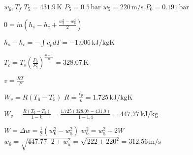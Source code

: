 \( w_6, T_f \)  
\( T_5 = 431.9 \, \text{K} \)  
\( P_5 = 0.5 \, \text{bar} \)  
\( w_5 = 220 \, \text{m/s} \)  
\( P_0 = 0.191 \, \text{bar} \)  

\( 0 = \dot{m} \left( h_s - h_c + \frac{w_5^2 - w_6^2}{2} \right) \)  

\( h_s - h_c = - \int c_p dT = -1.006 \, \text{kJ/kgK} \)  

\( T_c = T_s \left( \frac{P_0}{P_5} \right)^{\frac{n-1}{n}} = 328.07 \, \text{K} \)  

\( v = \frac{RT}{P} \)  

\( W_v = R \left( T_6 - T_5 \right) \)  
\( R = \frac{c_p}{k} = 1.725 \, \text{kJ/kgK} \)  

\( W_v = \frac{R \left( T_6 - T_5 \right)}{1 - k} = \frac{1.725 \left( 328.07 - 431.9 \right)}{1 - 1.4} = 447.77 \, \text{kJ/kg} \)  

\( W = \Delta w = \frac{1}{2} \left( w_6^2 - w_5^2 \right) \)  
\( w_6^2 = w_5^2 + 2W \)  
\( w_6 = \sqrt{447.77 \cdot 2 + w_5^2} = \sqrt{222 + 220^2} = 312.56 \, \text{m/s} \)